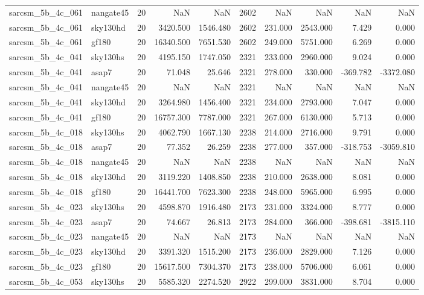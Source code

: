 \begin{tabular}{llrrrrrrrr}
sarcsm\_5b\_4c\_061 & nangate45 & 20 & NaN & NaN & 2602 & NaN & NaN & NaN & NaN \\
sarcsm\_5b\_4c\_061 & sky130hd & 20 & 3420.500 & 1546.480 & 2602 & 231.000 & 2543.000 & 7.429 & 0.000 \\
sarcsm\_5b\_4c\_061 & gf180 & 20 & 16340.500 & 7651.530 & 2602 & 249.000 & 5751.000 & 6.269 & 0.000 \\
sarcsm\_5b\_4c\_041 & sky130hs & 20 & 4195.150 & 1747.050 & 2321 & 233.000 & 2960.000 & 9.024 & 0.000 \\
sarcsm\_5b\_4c\_041 & asap7 & 20 & 71.048 & 25.646 & 2321 & 278.000 & 330.000 & -369.782 & -3372.080 \\
sarcsm\_5b\_4c\_041 & nangate45 & 20 & NaN & NaN & 2321 & NaN & NaN & NaN & NaN \\
sarcsm\_5b\_4c\_041 & sky130hd & 20 & 3264.980 & 1456.400 & 2321 & 234.000 & 2793.000 & 7.047 & 0.000 \\
sarcsm\_5b\_4c\_041 & gf180 & 20 & 16757.300 & 7787.000 & 2321 & 267.000 & 6130.000 & 5.713 & 0.000 \\
sarcsm\_5b\_4c\_018 & sky130hs & 20 & 4062.790 & 1667.130 & 2238 & 214.000 & 2716.000 & 9.791 & 0.000 \\
sarcsm\_5b\_4c\_018 & asap7 & 20 & 77.352 & 26.259 & 2238 & 277.000 & 357.000 & -318.753 & -3059.810 \\
sarcsm\_5b\_4c\_018 & nangate45 & 20 & NaN & NaN & 2238 & NaN & NaN & NaN & NaN \\
sarcsm\_5b\_4c\_018 & sky130hd & 20 & 3119.220 & 1408.850 & 2238 & 210.000 & 2638.000 & 8.081 & 0.000 \\
sarcsm\_5b\_4c\_018 & gf180 & 20 & 16441.700 & 7623.300 & 2238 & 248.000 & 5965.000 & 6.995 & 0.000 \\
sarcsm\_5b\_4c\_023 & sky130hs & 20 & 4598.870 & 1916.480 & 2173 & 231.000 & 3324.000 & 8.777 & 0.000 \\
sarcsm\_5b\_4c\_023 & asap7 & 20 & 74.667 & 26.813 & 2173 & 284.000 & 366.000 & -398.681 & -3815.110 \\
sarcsm\_5b\_4c\_023 & nangate45 & 20 & NaN & NaN & 2173 & NaN & NaN & NaN & NaN \\
sarcsm\_5b\_4c\_023 & sky130hd & 20 & 3391.320 & 1515.200 & 2173 & 236.000 & 2829.000 & 7.126 & 0.000 \\
sarcsm\_5b\_4c\_023 & gf180 & 20 & 15617.500 & 7304.370 & 2173 & 238.000 & 5706.000 & 6.061 & 0.000 \\
sarcsm\_5b\_4c\_053 & sky130hs & 20 & 5585.320 & 2274.520 & 2922 & 299.000 & 3831.000 & 8.704 & 0.000 \\

\end{tabular}
